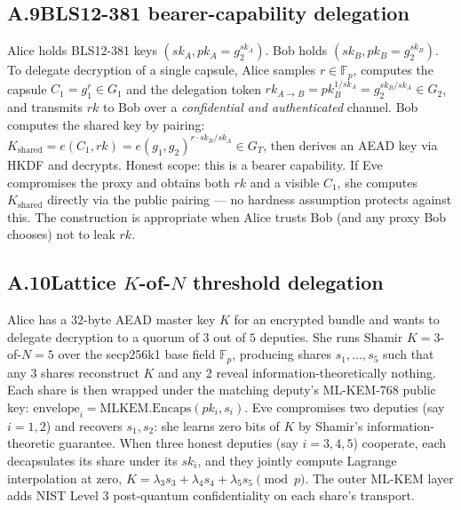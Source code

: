 \documentclass[11pt,letterpaper]{article}
\begin{document}
\subsection*{A.9\quad BLS12-381 bearer-capability delegation}
Alice holds BLS12-381 keys $(sk_A, pk_A = g_2^{sk_A})$. Bob
holds $(sk_B, pk_B = g_2^{sk_B})$. To delegate decryption of a
single capsule, Alice samples $r \in \mathbb{F}_p$, computes the
capsule $C_1 = g_1^r \in G_1$ and the delegation token
$rk_{A \to B} = pk_B^{1/sk_A} = g_2^{sk_B/sk_A} \in G_2$, and
transmits $rk$ to Bob over a \emph{confidential and authenticated}
channel. Bob computes the shared key by pairing:
$K_{\mathrm{shared}} = e(C_1, rk) = e(g_1, g_2)^{r \cdot sk_B/sk_A}
\in G_T$, then derives an AEAD key via HKDF and decrypts.
Honest scope: this is a bearer capability. If Eve compromises
the proxy and obtains both $rk$ and a visible $C_1$, she
computes $K_{\mathrm{shared}}$ directly via the public pairing
--- no hardness assumption protects against this. The
construction is appropriate when Alice trusts Bob (and any
proxy Bob chooses) not to leak $rk$.

\subsection*{A.10\quad Lattice $K$-of-$N$ threshold delegation}
Alice has a $32$-byte AEAD master key $K$ for an encrypted
bundle and wants to delegate decryption to a quorum of $3$ out
of $5$ deputies. She runs Shamir $K{=}3$-of-$N{=}5$ over the
secp256k1 base field $\mathbb{F}_p$, producing shares
$s_1, \ldots, s_5$ such that any $3$ shares reconstruct $K$ and
any $2$ reveal information-theoretically nothing. Each share is
then wrapped under the matching deputy's ML-KEM-768 public key:
$\mathrm{envelope}_i = \mathrm{MLKEM}.\mathrm{Encaps}(pk_i, s_i)$.
Eve compromises two deputies (say $i = 1, 2$) and recovers
$s_1, s_2$: she learns zero bits of $K$ by Shamir's
information-theoretic guarantee. When three honest deputies
(say $i = 3, 4, 5$) cooperate, each decapsulates its share
under its $sk_i$, and they jointly compute Lagrange
interpolation at zero, $K = \lambda_3 s_3 + \lambda_4 s_4 +
\lambda_5 s_5 \pmod{p}$. The outer ML-KEM layer adds NIST
Level 3 post-quantum confidentiality on each share's transport.
\end{document}
